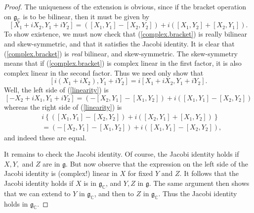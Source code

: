 \documentclass[12pt]{amsbook}
\let \frak = \mathfrak
\theoremstyle{plain}
\numberwithin{equation}{chapter}
\numberwithin{theorem}{chapter}
\begin{document}
\begin{proof}
The uniqueness of the extension is obvious, since if the bracket operation on
$\frak{g}_{\mathbb{C}}$ is to be bilinear, then it must be given by
\begin{equation}
\left[  X_{1}+iX_{2},Y_{1}+iY_{2}\right]  =\left(  \left[  X_{1},Y_{1}\right]
-\left[  X_{2},Y_{2}\right]  \right)  +i\left(  \left[  X_{1},Y_{2}\right]
+\left[  X_{2},Y_{1}\right]  \right)  \text{.}\label{complex.bracket}%
\end{equation}
To show existence, we must now check that (\ref{complex.bracket}) is really
bilinear and skew-symmetric, and that it satisfies the Jacobi identity. It is
clear that (\ref{complex.bracket}) is \textit{real} bilinear, and
skew-symmetric. The skew-symmetry means that if (\ref{complex.bracket}) is
complex linear in the first factor, it is also complex linear in the second
factor. Thus we need only show that
\begin{equation}
\left[  i(X_{1}+iX_{2}),Y_{1}+iY_{2}\right]  =i\left[  X_{1}+iX_{2}%
,Y_{1}+iY_{2}\right]  \text{.}\label{linearity}%
\end{equation}
Well, the left side of (\ref{linearity}) is
\[
\left[  -X_{2}+iX_{1},Y_{1}+iY_{2}\right]  =\left(  -\left[  X_{2}%
,Y_{1}\right]  -\left[  X_{1},Y_{2}\right]  \right)  +i\left(  \left[
X_{1},Y_{1}\right]  -\left[  X_{2},Y_{2}\right]  \right)
\]
whereas the right side of (\ref{linearity}) is
\begin{align*}
& i\left\{  \left(  \left[  X_{1},Y_{1}\right]  -\left[  X_{2},Y_{2}\right]
\right)  +i\left(  \left[  X_{2},Y_{1}\right]  +\left[  X_{1},Y_{2}\right]
\right)  \right\}  \\
& =\left(  -\left[  X_{2},Y_{1}\right]  -\left[  X_{1},Y_{2}\right]  \right)
+i\left(  \left[  X_{1},Y_{1}\right]  -\left[  X_{2},Y_{2}\right]  \right)
\text{,}%
\end{align*}
and indeed these are equal.

It remains to check the Jacobi identity. Of course, the Jacobi identity holds
if $X,Y,$ and $Z$ are in $\frak{g}$. But now observe that the expression on
the left side of the Jacobi identity is (complex!) linear in $X$ for fixed $Y$
and $Z$. It follows that the Jacobi identity holds if $X$ is in $\frak{g}%
_{\mathbb{C}}$, and $Y,Z$ in $\frak{g}$. The same argument then shows that we
can extend to $Y$ in $\frak{g}_{\mathbb{C}}$, and then to $Z$ in
$\frak{g}_{\mathbb{C}}$. Thus the Jacobi identity holds in $\frak{g}%
_{\mathbb{C}}$.
\end{proof}
\end{document}
